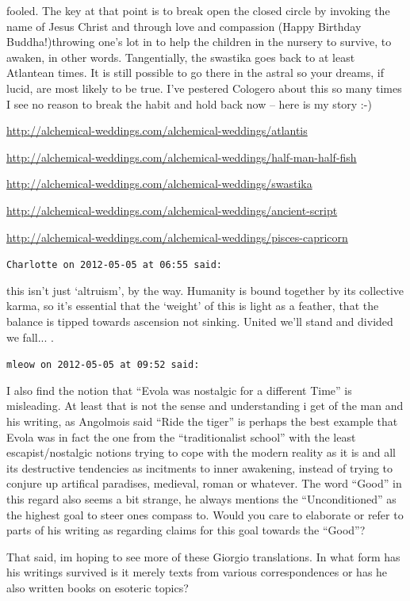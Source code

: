 \begin{footnotesize}
\begin{sffamily}
fooled. The key at that point is to break open the closed circle by invoking the name of Jesus Christ and through love and compassion (Happy Birthday Buddha!)throwing one's lot in to help the children in the nursery to survive, to awaken, in other words. Tangentially, the swastika goes back to at least Atlantean times. It is still possible to go there in the astral so your dreams, if lucid, are most likely to be true. I've pestered Cologero about this so many times I see no reason to break the habit and hold back now -- here is my story :-)

\url{http://alchemical-weddings.com/alchemical-weddings/atlantis}


\url{http://alchemical-weddings.com/alchemical-weddings/half-man-half-fish}


\url{http://alchemical-weddings.com/alchemical-weddings/swastika}


\url{http://alchemical-weddings.com/alchemical-weddings/ancient-script}

\url{http://alchemical-weddings.com/alchemical-weddings/pisces-capricorn}


\hfill

\texttt{Charlotte on 2012-05-05 at 06:55 said:}

this isn't just `altruism', by the way. Humanity is bound together by its collective karma, so it's essential that the `weight' of this is light as a feather, that the balance is tipped towards ascension not sinking. United we'll stand and divided we fall... .

\hfill

\texttt{mleow on 2012-05-05 at 09:52 said:}

I also find the notion that ``Evola was nostalgic for a different Time'' is misleading. At least that is not the sense and understanding i get of the man and his writing, as Angolmois said ``Ride the tiger'' is perhaps the best example that Evola was in fact the one from the ``traditionalist school'' with the least escapist/nostalgic notions trying to cope with the modern reality as it is and all its destructive tendencies as incitments to inner awakening, instead of trying to conjure up artifical paradises, medieval, roman or whatever. The word ``Good'' in this regard also seems a bit strange, he always mentions the ``Unconditioned'' as the highest goal to steer ones compass to. Would you care to elaborate or refer to parts of his writing as regarding claims for this goal towards the ``Good''?

That said, im hoping to see more of these Giorgio translations. In what form has his writings survived is it merely texts from various correspondences or has he also written books on esoteric topics?


\end{sffamily}
\end{footnotesize}
